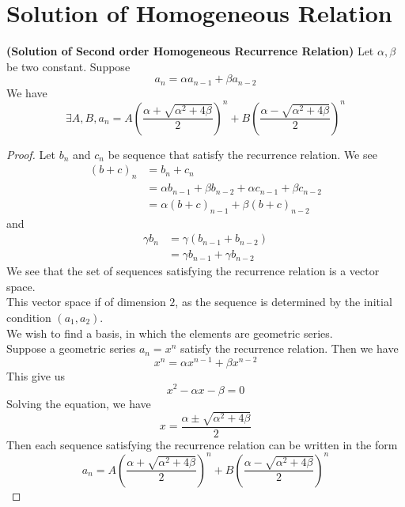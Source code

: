 \documentclass{report}
\begin{document}
\section{Solution of Homogeneous Relation}
\begin{theorem}
\textbf{(Solution of Second order Homogeneous Recurrence Relation)} Let $\alpha ,\beta $ be two constant. Suppose 
\begin{equation*}
a_n=\alpha a_{n-1}+\beta a_{n-2}
\end{equation*}
We have
\begin{equation*}
\exists A,B, a_n= A(\frac{\alpha +\sqrt{\alpha ^2+4\beta } }{2})^n+B(\frac{\alpha -\sqrt{\alpha ^2+4\beta } }{2})^n
\end{equation*}
\end{theorem}
\begin{proof}
Let $b_n$ and $c_n$ be sequence that satisfy the recurrence relation. We see 
\begin{align}
  (b+c)_n&=b_n+c_n\\
  &=\alpha b_{n-1}+\beta b_{n-2} +\alpha  c_{n-1}+\beta c_{n-2}\\
  &=\alpha (b+c)_{n-1}+\beta  (b+c)_{n-2}
\end{align}
and 
\begin{align}
\gamma b_n&=\gamma (b_{n-1}+b_{n-2})\\
&=\gamma b_{n-1}+\gamma b_{n-2}
\end{align}
We see that the set of sequences satisfying the recurrence relation is a vector space.\\

This vector space if of dimension $2$, as the sequence is determined by the initial condition $(a_1,a_2)$.\\ 

We wish to find a basis, in which the elements are geometric series.\\

Suppose a geometric series $a_n=x^n$ satisfy the recurrence relation. Then we have 
\begin{equation*}
x^n=\alpha x^{n-1}+\beta x^{n-2}
\end{equation*}
This give us 
\begin{equation*}
x^2-\alpha x-\beta =0
\end{equation*}
Solving the equation, we have
\begin{equation*}
x=\frac{\alpha \pm \sqrt{\alpha ^2+4\beta } }{2}
\end{equation*}
Then each sequence satisfying the recurrence relation can be written in the form 
\begin{equation*}
a_n= A(\frac{\alpha +\sqrt{\alpha ^2+4\beta } }{2})^n+B(\frac{\alpha -\sqrt{\alpha ^2+4\beta } }{2})^n
\end{equation*}

\end{proof}
\end{document}
